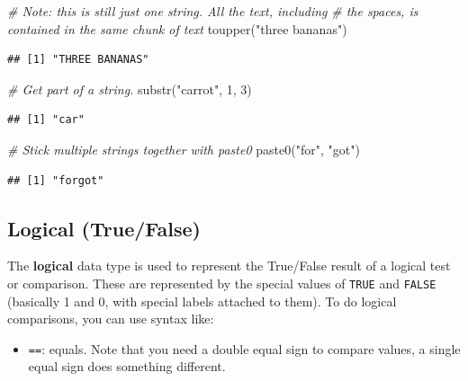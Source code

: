 \documentclass[
]{book}
\newenvironment{Shaded}{\begin{snugshade}}{\end{snugshade}}
\newcommand{\CommentTok}[1]{\textcolor[rgb]{0.56,0.35,0.01}{\textit{#1}}}
\newcommand{\DecValTok}[1]{\textcolor[rgb]{0.00,0.00,0.81}{#1}}
\newcommand{\FunctionTok}[1]{\textcolor[rgb]{0.00,0.00,0.00}{#1}}
\newcommand{\NormalTok}[1]{#1}
\newcommand{\StringTok}[1]{\textcolor[rgb]{0.31,0.60,0.02}{#1}}
\providecommand{\tightlist}{%
  \setlength{\itemsep}{0pt}\setlength{\parskip}{0pt}}
\begin{document}
\begin{Shaded}
\begin{Highlighting}[]
\CommentTok{\# Note: this is still just one string. All the text, including}
\CommentTok{\#   the spaces, is contained in the same chunk of text}
\FunctionTok{toupper}\NormalTok{(}\StringTok{"three bananas"}\NormalTok{)}
\end{Highlighting}
\end{Shaded}

\begin{verbatim}
## [1] "THREE BANANAS"
\end{verbatim}

\begin{Shaded}
\begin{Highlighting}[]
\CommentTok{\# Get part of a string.}
\FunctionTok{substr}\NormalTok{(}\StringTok{"carrot"}\NormalTok{, }\DecValTok{1}\NormalTok{, }\DecValTok{3}\NormalTok{)}
\end{Highlighting}
\end{Shaded}

\begin{verbatim}
## [1] "car"
\end{verbatim}

\begin{Shaded}
\begin{Highlighting}[]
\CommentTok{\# Stick multiple strings together with paste0}
\FunctionTok{paste0}\NormalTok{(}\StringTok{"for"}\NormalTok{, }\StringTok{"got"}\NormalTok{)}
\end{Highlighting}
\end{Shaded}

\begin{verbatim}
## [1] "forgot"
\end{verbatim}

\hypertarget{logical-truefalse}{%
\subsection{Logical (True/False)}\label{logical-truefalse}}

The \textbf{logical} data type is used to represent the True/False result
of a logical test or comparison. These are represented by the
special values of \texttt{TRUE} and \texttt{FALSE} (basically 1 and 0, with special labels
attached to them). To do logical comparisons, you can use syntax like:

\begin{itemize}
\tightlist
\item
  \texttt{==}: equals. Note that you need a double equal sign to compare values,
  a single equal sign does something different.
\end{itemize}
\end{document}
